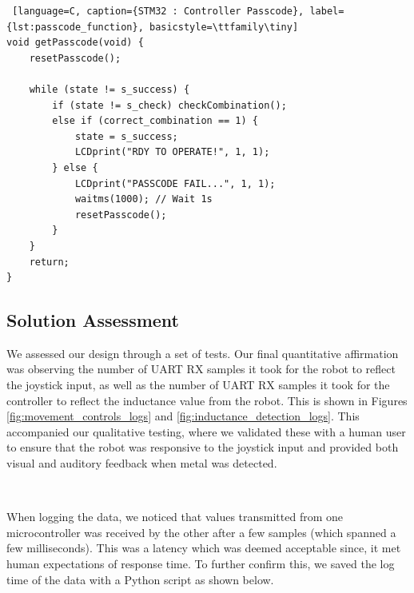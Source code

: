 \documentclass{article}
\begin{document}
\begin{lstlisting} [language=C, caption={STM32 : Controller Passcode}, label={lst:passcode_function}, basicstyle=\ttfamily\tiny]
void getPasscode(void) {
    resetPasscode();

    while (state != s_success) {
        if (state != s_check) checkCombination();
        else if (correct_combination == 1) {
            state = s_success;
            LCDprint("RDY TO OPERATE!", 1, 1);
        } else {
            LCDprint("PASSCODE FAIL...", 1, 1);
            waitms(1000); // Wait 1s
            resetPasscode();
        }
    }
    return;
}
\end{lstlisting}



\subsection{Solution Assessment}

We assessed our design through a set of tests. Our final quantitative affirmation was observing the number of UART RX samples it took for the robot to reflect the joystick input,
as well as the number of UART RX samples it took for the controller to reflect the inductance value from the robot. This is shown in
Figures \ref{fig:movement_controls_logs} and \ref{fig:inductance_detection_logs}. This accompanied our qualitative testing, where we validated these with a human user to ensure that the robot
was responsive to the joystick input and provided both visual and auditory feedback when metal was detected.

\

When logging the data, we noticed that values transmitted from one microcontroller was received by the other after a few samples (which spanned a few milliseconds). This was a latency which
was deemed acceptable since, it met human expectations of response time. To further confirm this, we saved the log time of the data with a Python script as shown below.
\end{document}
